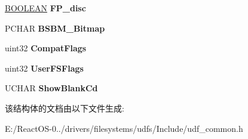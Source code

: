 \begin{DoxyCompactItemize}
\hyperlink{_processor_bind_8h_a112e3146cb38b6ee95e64d85842e380a}{B\+O\+O\+L\+E\+AN} {\bfseries F\+P\+\_\+disc}
\item 
\mbox{\label{struct___u_d_f_volume_control_block_a675a962f73d9aee6348c9fab5c165164}} 
P\+C\+H\+AR {\bfseries B\+S\+B\+M\+\_\+\+Bitmap}
\item 
\mbox{\label{struct___u_d_f_volume_control_block_a8a094ec318082cec1527e5b9a993bd83}} 
uint32 {\bfseries Compat\+Flags}
\item 
\mbox{\label{struct___u_d_f_volume_control_block_ae7532a773ffc1923a779f76afabc915d}} 
uint32 {\bfseries User\+F\+S\+Flags}
\item 
\mbox{\label{struct___u_d_f_volume_control_block_a5007cee57eb85b26ba3853787e6bf35c}} 
U\+C\+H\+AR {\bfseries Show\+Blank\+Cd}
\end{DoxyCompactItemize}


该结构体的文档由以下文件生成\+:\begin{DoxyCompactItemize}
\item 
E\+:/\+React\+O\+S-\/0../drivers/filesystems/udfs/\+Include/udf\+\_\+common.\+h\end{DoxyCompactItemize}
